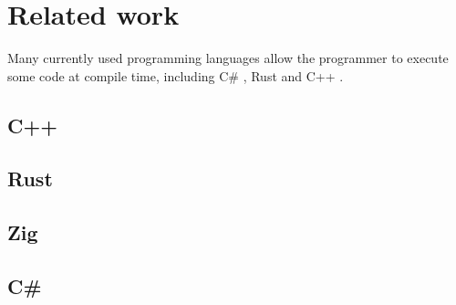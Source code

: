 \section{Related work}
\label{related-work} 

Many currently used programming languages allow the programmer to execute some code at compile time, including C\# \cite{csharp:source_generators,roslyn}, Rust \cite{rust, klabnik2019rust} and C++ \cite{ISO:cpp20}.

\subsection{C++}

\subsection{Rust}

\subsection{Zig}

\subsection{C\#}
